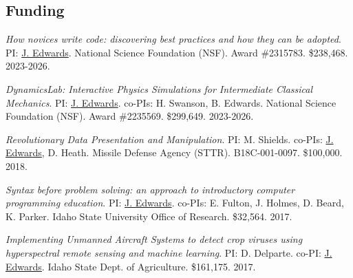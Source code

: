 \documentclass[margin,line]{res}
\begin{document}
\begin{resume}

\section{\sc Funding}
\textit{How novices write code: discovering best practices and how they can be adopted}. PI: \underline{J. Edwards}. National Science Foundation (NSF). Award \#2315783. \$238,468. 2023-2026.

\textit{DynamicsLab: Interactive Physics Simulations for Intermediate Classical Mechanics}. PI: \underline{J. Edwards}. co-PIs: H. Swanson, B. Edwards. National Science Foundation (NSF). Award \#2235569. \$299,649. 2023-2026.

\textit{Revolutionary Data Presentation and Manipulation}. PI: M. Shields. co-PIs: \underline{J. Edwards}, D. Heath. Missile Defense Agency (STTR). B18C-001-0097. \$100,000. 2018.

\textit{Syntax before problem solving: an approach to introductory computer programming education}. PI: \underline{J. Edwards}. co-PIs: E. Fulton, J. Holmes, D. Beard, K. Parker. Idaho State University Office of Research. \$32,564. 2017.

\textit{Implementing Unmanned Aircraft Systems to detect crop viruses using hyperspectral remote sensing and machine learning}. PI: D. Delparte. co-PI: \underline{J. Edwards}. Idaho State Dept. of Agriculture. \$161,175. 2017.



\end{resume}
\end{document}
